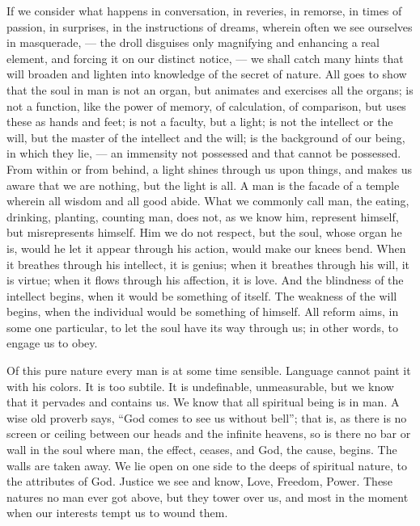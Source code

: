 \documentclass{article}
\begin{document}
If we consider what happens in conversation, in reveries, in remorse, in times of passion, in surprises, in the instructions of dreams, wherein often we see ourselves in masquerade, --- the droll disguises only magnifying and enhancing a real element, and forcing it on our distinct notice, --- we shall catch many hints that will broaden and lighten into knowledge of the secret of nature. All goes to show that the soul in man is not an organ, but animates and exercises all the organs; is not a function, like the power of memory, of calculation, of comparison, but uses these as hands and feet; is not a faculty, but a light; is not the intellect or the will, but the master of the intellect and the will; is the background of our being, in which they lie, --- an immensity not possessed and that cannot be possessed. From within or from behind, a light shines through us upon things, and makes us aware that we are nothing, but the light is all. A man is the facade of a temple wherein all wisdom and all good abide. What we commonly call man, the eating, drinking, planting, counting man, does not, as we know him, represent himself, but misrepresents himself. Him we do not respect, but the soul, whose organ he is, would he let it appear through his action, would make our knees bend. When it breathes through his intellect, it is genius; when it breathes through his will, it is virtue; when it flows through his affection, it is love. And the blindness of the intellect begins, when it would be something of itself. The weakness of the will begins, when the individual would be something of himself. All reform aims, in some one particular, to let the soul have its way through us; in other words, to engage us to obey.

Of this pure nature every man is at some time sensible. Language cannot paint it with his colors. It is too subtile. It is undefinable, unmeasurable, but we know that it pervades and contains us. We know that all spiritual being is in man. A wise old proverb says, ``God comes to see us without bell''; that is, as there is no screen or ceiling between our heads and the infinite heavens, so is there no bar or wall in the soul where man, the effect, ceases, and God, the cause, begins. The walls are taken away. We lie open on one side to the deeps of spiritual nature, to the attributes of God. Justice we see and know, Love, Freedom, Power. These natures no man ever got above, but they tower over us, and most in the moment when our interests tempt us to wound them.
\end{document}
